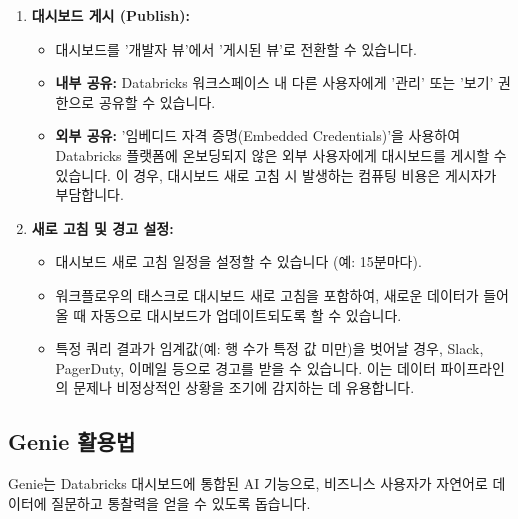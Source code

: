 \documentclass[11pt,a4paper]{article}
\begin{document}
\begin{enumerate}
\begin{itemize}
        \item AI 어시스턴트가 자동으로 '총 수익', '경로별 수익 분포', '픽업 지역별 여행 횟수' 등 다양한 시각화 아이디어를 제안합니다.
        \item 원하는 제안을 선택하면, 어시스턴트가 자동으로 시각화(예: 막대 차트)를 생성합니다.
        \item 생성된 시각화의 제목, 설명, 데이터셋, 차트 유형(막대, 산점도 등), 색상 등을 왼쪽 패널에서 수정할 수 있습니다.
        \item 어시스턴트가 생성한 SQL 코드를 확인하고, 필요에 따라 추가적인 지시를 내리거나 수락/거부할 수 있습니다.
    \end{itemize}
    \item \textbf{대시보드 게시 (Publish):}
    \begin{itemize}
        \item 대시보드를 '개발자 뷰'에서 '게시된 뷰'로 전환할 수 있습니다.
        \item \textbf{내부 공유:} Databricks 워크스페이스 내 다른 사용자에게 '관리' 또는 '보기' 권한으로 공유할 수 있습니다.
        \item \textbf{외부 공유:} '임베디드 자격 증명(Embedded Credentials)'을 사용하여 Databricks 플랫폼에 온보딩되지 않은 외부 사용자에게 대시보드를 게시할 수 있습니다. 이 경우, 대시보드 새로 고침 시 발생하는 컴퓨팅 비용은 게시자가 부담합니다.
    \end{itemize}
    \item \textbf{새로 고침 및 경고 설정:}
    \begin{itemize}
        \item 대시보드 새로 고침 일정을 설정할 수 있습니다 (예: 15분마다).
        \item 워크플로우의 태스크로 대시보드 새로 고침을 포함하여, 새로운 데이터가 들어올 때 자동으로 대시보드가 업데이트되도록 할 수 있습니다.
        \item 특정 쿼리 결과가 임계값(예: 행 수가 특정 값 미만)을 벗어날 경우, Slack, PagerDuty, 이메일 등으로 경고를 받을 수 있습니다. 이는 데이터 파이프라인의 문제나 비정상적인 상황을 조기에 감지하는 데 유용합니다.
    \end{itemize}
\end{enumerate}

\subsection{Genie 활용법}
Genie는 Databricks 대시보드에 통합된 AI 기능으로, 비즈니스 사용자가 자연어로 데이터에 질문하고 통찰력을 얻을 수 있도록 돕습니다.
\end{document}
